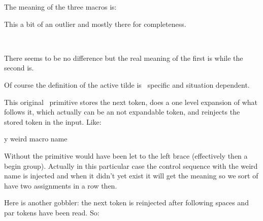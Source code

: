 The meaning of the three macros is:

\startlines \getbuffer \tttf
\meaningfull\testa
\meaningfull\testb
\meaningfull\testc
\stoplines

\stopnewprimitive

\startnewprimitive[title={\prm {expandactive}}]

This a bit of an outlier and mostly there for completeness.

\startbuffer
                          \meaningasis~
\edef\foo{~}              \meaningasis\foo
\edef\foo{\expandactive~} \meaningasis\foo
\stopbuffer

\typebuffer

There seems to be no difference but the real meaning of the first \type {\foo} is
 while the second \type {\foo}  is.


\startlines
\getbuffer
\stoplines

Of course the definition of the active tilde is \CONTEXT\ specific and situation
dependent.

\stopnewprimitive

\startoldprimitive[title={\prm {expandafter}}]

This original \TEX\ primitive stores the next token, does a one level expansion
of what follows it, which actually can be an not expandable token, and
reinjects the stored token in the input. Like:

\starttyping
\expandafter\let\csname my weird macro name
\stoptyping

Without  the  primitive would have been let to
the left brace (effectively then a begin group). Actually in this particular case
the control sequence with the weird name is injected and when it didn't yet exist
it will get the meaning  so we sort of have two assignments in a
row then.

\stopoldprimitive

\startnewprimitive[title={\prm {expandafterpars}}]

Here is another gobbler: the next token is reinjected after following spaces
and par tokens have been read. So:

\startbuffer
[\expandafterpars 1 2]
[\expandafterpars 3
4]
[\expandafterpars 5

6]
\stopbuffer

\typebuffer

